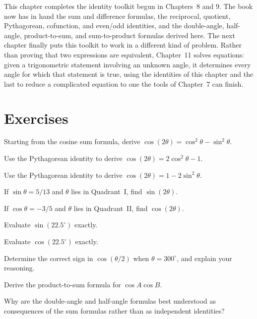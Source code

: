 This chapter completes the identity toolkit begun in Chapters~8 and 9. The
book now has in hand the sum and difference formulas, the reciprocal,
quotient, Pythagorean, cofunction, and even/odd identities, and the
double-angle, half-angle, product-to-sum, and sum-to-product formulas
derived here. The next chapter finally puts this toolkit to work in a
different kind of problem. Rather than proving that two expressions are
equivalent, Chapter~11 solves equations: given a trigonometric statement
involving an unknown angle, it determines every angle for which that
statement is true, using the identities of this chapter and the last to
reduce a complicated equation to one the tools of Chapter~7 can finish.

\section{Exercises}
\begin{exercise}
Starting from the cosine sum formula, derive $\cos(2\theta) = \cos^2\theta
- \sin^2\theta$.
\end{exercise}

\begin{exercise}
Use the Pythagorean identity to derive $\cos(2\theta) = 2\cos^2\theta - 1$.
\end{exercise}

\begin{exercise}
Use the Pythagorean identity to derive $\cos(2\theta) = 1 - 2\sin^2\theta$.
\end{exercise}

\begin{exercise}
If $\sin\theta = 5/13$ and $\theta$ lies in Quadrant~I, find $\sin(2\theta)$.
\end{exercise}

\begin{exercise}
If $\cos\theta = -3/5$ and $\theta$ lies in Quadrant~II, find
$\cos(2\theta)$.
\end{exercise}

\begin{exercise}
Evaluate $\sin(22.5^\circ)$ exactly.
\end{exercise}

\begin{exercise}
Evaluate $\cos(22.5^\circ)$ exactly.
\end{exercise}

\begin{exercise}
Determine the correct sign in $\cos(\theta/2)$ when $\theta = 300^\circ$,
and explain your reasoning.
\end{exercise}

\begin{exercise}
Derive the product-to-sum formula for $\cos A\cos B$.
\end{exercise}

\begin{exercise}
Why are the double-angle and half-angle formulas best understood as
consequences of the sum formulas rather than as independent identities?
\end{exercise}
